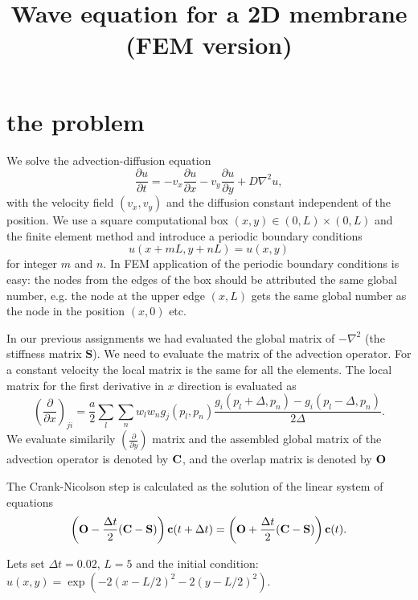 \documentclass[7pt]{article}
\title{Wave equation for a 2D membrane (FEM version)}
\begin{document}
\maketitle




\section{the problem}


We solve the advection-diffusion equation
\begin{equation} \frac{\partial u}{\partial t}=-v_x\frac{\partial u}{\partial x} - v_y\frac{\partial u}{\partial y} +D\nabla^2 u, \end{equation}
with the velocity field $(v_x,v_y)$ and the diffusion constant independent of the position.
We use a square computational box $(x,y)\in(0,L)\times(0,L)$ and the finite element method and introduce a periodic boundary conditions
\begin{equation} u(x+mL,y+nL)=u(x,y) \end{equation} for integer $m$ and $n$. In FEM application of the periodic boundary conditions is easy:
the nodes from the edges of the box should be attributed the same global number, e.g. the node at the upper edge $(x,L)$ gets the same global number as the node
in the position $(x,0)$ etc. 

In our previous assignments we had evaluated the global matrix of $-\nabla^2$ (the stiffness matrix {\bf S}).
We need to evaluate the matrix of the advection operator. For a constant velocity the local matrix
is the same for all the elements. The local matrix for the first derivative in $x$ direction is evaluated as  
$$(\frac{\partial}{\partial x})_{ji}=\frac{a}{2}\sum_{l}\sum_{n}  w_l w_n  g_j(p_l,p_n)\frac{ g_i(p_l+\Delta,p_n)-g_i(p_l-\Delta,p_n)}{2\Delta }.$$
We evaluate similarily $(\frac{\partial}{\partial y})$ matrix and the assembled global matrix of the advection operator is denoted by ${\bf C}$,
and the overlap matrix is denoted by ${\bf O}$

The Crank-Nicolson step is calculated as the solution of the linear system of equations
$$\left({\bf O} -\frac{\Delta t}{2}({\bf C-S})\right){\bf c}(t+\Delta t)=\left({\bf O} +\frac{\Delta t}{2}({\bf C-S})\right){\bf c}(t).$$


Lets set $\Delta t=0.02$, $L=5$ and the initial condition:   $u(x,y)=\exp(-2(x-L/2)^2-2(y-L/2)^2)$.




\end{document}

